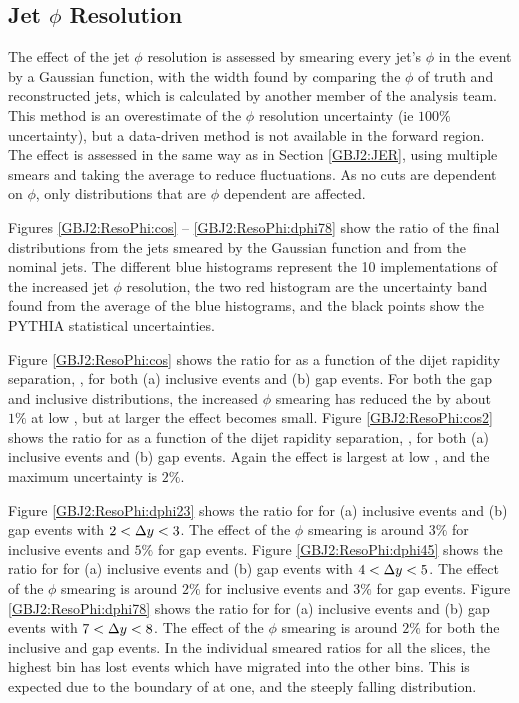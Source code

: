 \subsection{Jet $\phi{}$ Resolution}
\label{GBJ2:JPhiR}

The effect of the jet $\phi$ resolution is assessed by smearing every jet's $\phi$ in the event by a Gaussian function, with the width found by comparing the $\phi$ of truth and reconstructed jets, which is calculated by another member of the analysis team. 
This method is an overestimate of the $\phi$ resolution uncertainty (ie $100\%$ uncertainty), but a data-driven method is not available in the forward region.
The effect is assessed in the same way as in Section \ref{GBJ2:JER}, using multiple smears and taking the average to reduce fluctuations. 
As no cuts are dependent on $\phi$, only distributions that are $\phi$ dependent are affected.

Figures \ref{GBJ2:ResoPhi:cos} -- \ref{GBJ2:ResoPhi:dphi78} show the ratio of the final distributions from the jets smeared by the Gaussian function and from the nominal jets.
The different blue histograms represent the 10 implementations of the increased jet $\phi$ resolution, the two red histogram are the uncertainty band found from the average of the blue histograms, and the black points show the PYTHIA statistical uncertainties.

Figure \ref{GBJ2:ResoPhi:cos} shows the ratio for \mean{\cosdphi{}} as a function of the dijet rapidity separation, \dy{}, for both (a) inclusive events and (b) gap events.
For both the gap and inclusive distributions, the increased $\phi$ smearing has reduced the \mean{\cosdphi{}} by about $1\%$ at low \dy{}, but at larger \dy{} the effect becomes small.
Figure \ref{GBJ2:ResoPhi:cos2} shows the ratio for \mean{\costwodphi{}} as a function of the dijet rapidity separation, \dy{}, for both (a) inclusive events and (b) gap events.
Again the effect is largest at low \dy{}, and the maximum uncertainty is  $2\%$. 

Figure \ref{GBJ2:ResoPhi:dphi23} shows the ratio for \dphiDist{} for (a) inclusive events and (b) gap events with $2<\mbox{$\Delta y$}{}<3$.
The effect of the $\phi$ smearing is around  $3\%$ for inclusive events and  $5\%$ for gap events.
Figure \ref{GBJ2:ResoPhi:dphi45} shows the ratio for \dphiDist{} for (a) inclusive events and (b) gap events with $4<\mbox{$\Delta y$}{}<5$.
The effect of the $\phi$ smearing is around  $2\%$ for inclusive events and  $3\%$ for gap events.
Figure \ref{GBJ2:ResoPhi:dphi78} shows the ratio for \dphiDist{} for (a) inclusive events and (b) gap events with $7<\mbox{$\Delta y$}{}<8$.
The effect of the $\phi$ smearing is around  $2\%$ for both the inclusive and gap events.
In the \dphi{} individual smeared ratios for all the \dy{} slices, the highest \dphi{} bin has lost events which have migrated into the other \dphi{} bins. 
This is expected due to the boundary of \dphi{} at one, and the steeply falling \dphi{} distribution.


